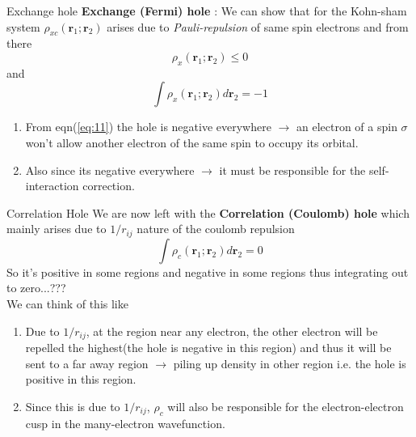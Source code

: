 \documentclass{beamer}
\begin{document}
	\begin{frame}[t]{Exchange hole}
	\textbf{Exchange (Fermi) hole} : We can show that for the Kohn-sham system $\rho_{xc}(\textbf{r}_1;\textbf{r}_2)$ arises due to \textit{Pauli-repulsion} of same spin electrons and from there 
	\begin{equation}\label{eq:11}
	\rho_{x}(\textbf{r}_1;\textbf{r}_2) \leqslant 0
	\end{equation}
	and
	\begin{equation}\label{eq:12}
	\displaystyle{\int} \rho_{x}(\textbf{r}_1;\textbf{r}_2) d\textbf{r}_2 = -1
	\end{equation}
	\begin{enumerate}
	\item{From eqn(\ref{eq:11}) the hole is negative everywhere $\rightarrow$ an electron of a spin $\sigma$ won't allow another electron of the same spin to occupy its orbital.}
	\item{Also since its negative everywhere $\rightarrow$ it must be responsible for the self-interaction correction.}
	\end{enumerate}
	\end{frame}
	
	\begin{frame}[t]{Correlation Hole}
	We are now left with the \textbf{Correlation (Coulomb) hole} which mainly arises due to $1/r_{ij}$ nature of the coulomb repulsion
	\begin{equation}\label{eq:13}
	\displaystyle{\int} \rho_{c}(\textbf{r}_1;\textbf{r}_2) d\textbf{r}_2 = 0
	\end{equation}
	So  it's positive in some regions and negative in some regions thus integrating out to zero...???\\We can think of this like
	\begin{enumerate}
	\item{Due to $1/r_{ij}$, at the region near any electron, the other electron will be repelled the highest(the hole is negative in this region) and thus it will be sent to a far away region $\rightarrow$ piling up density in other region i.e. the hole is positive in this region.}
	\item{Since this is due to $1/r_{ij}$, $\rho_c$ will also be responsible for the electron-electron cusp in the many-electron wavefunction.}
	\end{enumerate}
	\end{frame}
	
\end{document}
